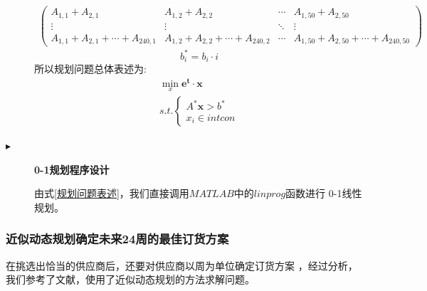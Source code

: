 \documentclass{cumcmthesis}
\begin{document}
\begin{description}
{\begin{equation}
\begin{aligned}
\begin{pmatrix}
                    A_{1,1} + A_{2,1}                      & A_{1,2} + A_{2,2}                      & \cdots & A_{1,50} + A_{2,50}                       \\
                    \vdots                                 & \vdots                                 & \ddots & \vdots                                    \\
                    A_{1,1} + A_{2,1} + \cdots + A_{240,1} & A_{1,2} + A_{2,2} + \cdots + A_{240,2} & \cdots & A_{1,50} + A_{2,50} + \cdots + A_{240,50}
                \end{pmatrix} \nonumber
            \end{aligned}
        \end{equation}
        }
        \begin{equation}
            b^*_i = b_i \cdot i \nonumber
        \end{equation}
        所以规划问题总体表述为:
        \begin{equation}
            \begin{aligned}
                \min_x \bm{e^t}\cdot \bm{x} \\
                s.t. \left\{
                \begin{aligned}
                    A^*\bm{x} > b^* \\
                    x_i \in intcon
                \end{aligned}
                \right.
            \end{aligned} \label{规划问题表述}
        \end{equation}

    \item[$\blacktriangleright$] \textbf{0-1规划程序设计}\par
        由式\ref{规划问题表述}，我们直接调用$MATLAB$中的$linprog$函数进行
        0-1线性规划。


\end{description}
\subsubsection{近似动态规划确定未来24周的最佳订货方案}
在挑选出恰当的供应商后，还要对供应商以周为单位确定订货方案
，经过分析，我们参考了文献，使用了近似动态规划的方法求解问题。
\end{document}
